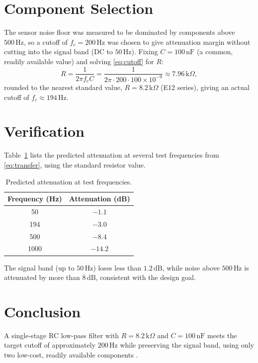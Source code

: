 \documentclass[a4paper,11pt,twocolumn]{article}
\begin{document}
\section{Component Selection}

The sensor noise floor was measured to be dominated by components above
$500\,\text{Hz}$, so a cutoff of $f_c = 200\,\text{Hz}$ was chosen to
give attenuation margin without cutting into the signal band (DC to
$50\,\text{Hz}$). Fixing $C = 100\,\text{nF}$ (a common, readily
available value) and solving \eqref{eq:cutoff} for $R$:
\begin{equation}
  R = \frac{1}{2\pi f_c C}
  = \frac{1}{2\pi \cdot 200 \cdot 100 \times 10^{-9}}
  \approx 7.96\,\text{k}\Omega,
\end{equation}
rounded to the nearest standard value, $R = 8.2\,\text{k}\Omega$
(E12 series), giving an actual cutoff of $f_c \approx 194\,\text{Hz}$.

\section{Verification}

Table~\ref{tab:atten} lists the predicted attenuation at several test
frequencies from \eqref{eq:transfer}, using the standard resistor value.

\begin{table}[!h]
\centering
\caption{Predicted attenuation at test frequencies.}
\label{tab:atten}
\begin{tabular}{cc}
\hline
Frequency (Hz) & Attenuation (dB) \\
\hline
50   & $-1.1$ \\
194  & $-3.0$ \\
500  & $-8.4$ \\
1000 & $-14.2$ \\
\hline
\end{tabular}
\end{table}

The signal band (up to $50\,\text{Hz}$) loses less than $1.2\,\text{dB}$,
while noise above $500\,\text{Hz}$ is attenuated by more than
$8\,\text{dB}$, consistent with the design goal.

\section{Conclusion}

A single-stage RC low-pass filter with $R = 8.2\,\text{k}\Omega$ and
$C = 100\,\text{nF}$ meets the target cutoff of approximately
$200\,\text{Hz}$ while preserving the signal band, using only two
low-cost, readily available components \citep{horowitz2015art}.



\end{document}

